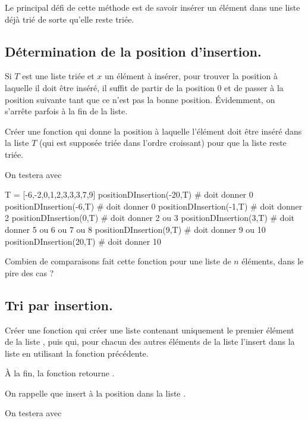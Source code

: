 \documentclass[french,12pt,twoside]{VcCours}
\begin{document}
Le principal défi de cette méthode est de savoir insérer un élément dans une 
liste déjà trié de sorte qu'elle reste triée.

\subsection{Détermination de la position d'insertion.}
Si $T$ est une liste triée et $x$ un élément à insérer, pour trouver la position 
à laquelle il doit être inséré, il suffit de partir de la position $0$ et de 
passer à la position suivante tant que ce n'est pas la bonne position. 
Évidemment, on s'arrête parfois à la fin de la liste.

\begin{Exercice}
Créer une fonction  qui donne la position à 
laquelle l'élément  doit être inséré dans la liste $T$ (qui est supposée 
triée dans l'ordre croissant) pour que la liste reste triée.

On testera avec 
\end{Exercice}
\begin{Python}
T =  [-6,-2,0,1,2,3,3,3,7,9]
positionDInsertion(-20,T) # doit donner 0
positionDInsertion(-6,T) # doit donner 0
positionDInsertion(-1,T) # doit donner 2
positionDInsertion(0,T) # doit donner 2 ou 3
positionDInsertion(3,T) # doit donner 5 ou 6 ou 7 ou 8
positionDInsertion(9,T) # doit donner 9 ou 10
positionDInsertion(20,T) # doit donner 10
\end{Python}

\begin{Exercice}
Combien de comparaisons fait cette fonction pour une liste de $n$ éléments, dans 
le pire des cas ?
\end{Exercice}


\subsection{Tri par insertion.}

\begin{Exercice}
Créer une fonction  qui créer une liste  contenant 
uniquement le premier élément de la liste , puis qui, pour chacun des 
autres éléments de la liste  l'insert dans la liste  en 
utilisant la fonction précédente.

À la fin, la fonction  retourne .

On rappelle que  insert  à la position  dans la 
liste .

On testera avec 
\end{Exercice}
\end{document}
